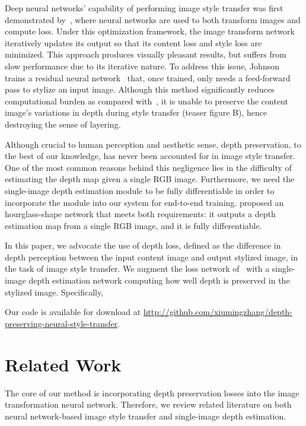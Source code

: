 \documentclass[10pt,twocolumn,letterpaper]{article}
\begin{document}
Deep neural networks' capability of performing image style transfer was first demonstrated by~\cite{gatys2016image}, where neural networks are used to both transform images and compute loss. Under this optimization framework, the image transform network iteratively updates its output so that its content loss and style loss are minimized. This approach produces visually pleasant results, but suffers from slow performance due to its iterative nature. To address this issue, Johnson \etal~\cite{johnson2016perceptual} trains a residual neural network~\cite{he2016deep} that, once trained, only needs a feed-forward pass to stylize an input image. Although this method significantly reduces computational burden as compared with~\cite{gatys2016image}, it is unable to preserve the content image's variations in depth during style transfer (teaser figure B), hence destroying the sense of layering.

Although crucial to human perception and aesthetic sense, depth preservation, to the best of our knowledge, has never been accounted for in image style transfer. One of the most common reasons behind this negligence lies in the difficulty of estimating the depth map given a single RGB image. Furthermore, we need the single-image depth estimation module to be fully differentiable in order to incorporate the module into our system for end-to-end training. \cite{chen2016single} proposed an hourglass-shape network that meets both requirements: it outputs a depth estimation map from a single RGB image, and it is fully differentiable. 

In this paper, we advocate the use of depth loss, defined as the difference in depth perception between the input content image and output stylized image, in the task of image style transfer. We augment the loss network of~\cite{johnson2016perceptual} with a single-image depth estimation network computing how well depth is preserved in the stylized image. Specifically, 

Our code is available for download at \url{http://github.com/xiumingzhang/depth-preserving-neural-style-transfer}.

\section{Related Work}

The core of our method is incorporating depth preservation losses into the image transformation neural network. Therefore, we review related literature on both neural network-based image style transfer and single-image depth estimation.
\end{document}
